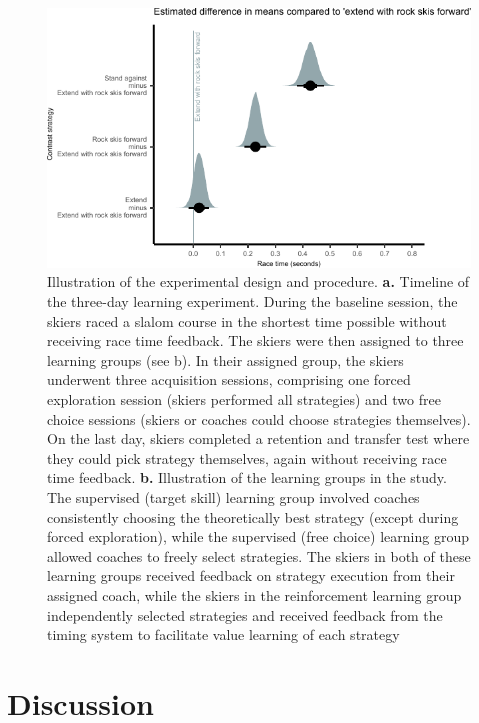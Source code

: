 \documentclass[letterpaper,10pt]{article}
\begin{document}
\begin{figure}[H]
\centering
\includegraphics{figure_results_Q1_strategies.pdf}
\caption{Illustration of the experimental design and procedure. \textbf{a.} Timeline of the three-day learning experiment. During the baseline session, the skiers raced a slalom course in the shortest time possible without receiving race time feedback. The skiers were then assigned to three learning groups (see b). In their assigned group, the skiers underwent three acquisition sessions, comprising one forced exploration session (skiers performed all strategies) and two free choice sessions (skiers or coaches could choose strategies themselves). On the last day, skiers completed a retention and transfer test where they could pick strategy themselves, again without receiving race time feedback. \textbf{b.} Illustration of the learning groups in the study. The supervised (target skill) learning group involved coaches consistently choosing the theoretically best strategy (except during forced exploration), while the supervised (free choice) learning group allowed coaches to freely select strategies. The skiers in both of these learning groups received feedback on strategy execution from their assigned coach, while the skiers in the reinforcement learning group independently selected strategies and received feedback from the timing system to facilitate value learning of each strategy}
\label{fig:experiment}
\end{figure}



\section{Discussion}

\section{}

\printbibliography
\end{document}
